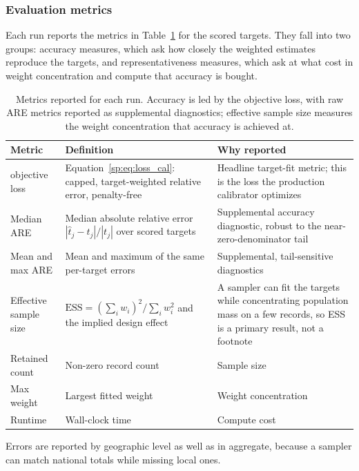 \subsubsection{Evaluation metrics}
\label{sp:sec:metrics}

Each run reports the metrics in Table~\ref{sp:tab:metrics} for the scored targets. They fall into two
groups: accuracy measures, which ask how closely the weighted
estimates reproduce the targets, and representativeness measures, which ask at what cost in weight
concentration and compute that accuracy is bought.

\begin{table}[H]
\centering
{\tablefont
\begin{tabular}{p{}p{}p{}}
\toprule
Metric & Definition & Why reported \\
\midrule
\populace{} objective loss & Equation~\ref{sp:eq:loss_cal}: capped, target-weighted relative error, penalty-free & Headline target-fit metric; this is the loss the production calibrator optimizes \\
Median ARE & Median absolute relative error $|\hat{t}_j - t_j| / |t_j|$ over scored targets & Supplemental accuracy diagnostic, robust to the near-zero-denominator tail \\
Mean and max ARE & Mean and maximum of the same per-target errors & Supplemental, tail-sensitive diagnostics \\
Effective sample size & $\mathrm{ESS} = (\sum_i w_i)^2 / \sum_i w_i^2$ and the implied design effect & A sampler can fit the targets while concentrating population mass on a few records, so ESS is a primary result, not a footnote \\
Retained count & Non-zero record count & Sample size \\
Max weight & Largest fitted weight & Weight concentration \\
Runtime & Wall-clock time & Compute cost \\
\bottomrule
\end{tabular}
}
\caption{Metrics reported for each run. Accuracy is led by the \populace{} objective loss, with raw ARE
metrics reported as supplemental diagnostics; effective sample size measures the weight concentration that
accuracy is achieved at.}
\label{sp:tab:metrics}
\end{table}

Errors are reported by geographic level as well as in aggregate, because a sampler can match national
totals while missing local ones.

